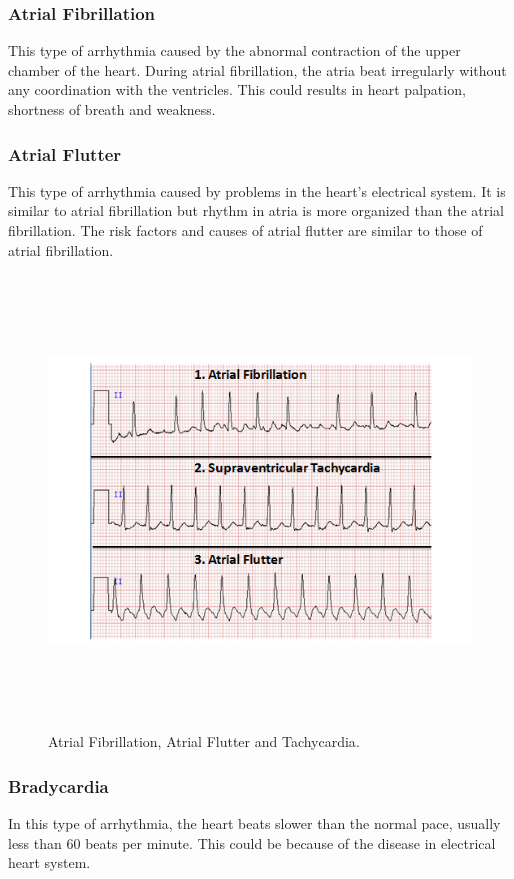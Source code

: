 \subsubsection{Atrial Fibrillation}
This type of arrhythmia caused by the abnormal contraction of the upper chamber of the heart. During atrial fibrillation, the atria beat irregularly without any coordination with the ventricles. This could results in heart palpation, shortness of breath and weakness.


\subsubsection{Atrial Flutter}
This type of arrhythmia caused by problems in the heart's electrical system. It is similar to atrial fibrillation but rhythm in atria is more organized than the atrial fibrillation. The risk factors and causes of atrial flutter are similar to those of atrial fibrillation.

\begin{figure}[htpb]
	\centering
	\includegraphics[width=15cm,height=12cm,keepaspectratio=true]{images/af}
	\caption{
		Atrial Fibrillation, Atrial Flutter and Tachycardia\cite{sumdu}.
	}
	\label{fig:af}
\end{figure}


\subsubsection{Bradycardia}
In this type of arrhythmia, the heart beats slower than the normal pace, usually less than 60 beats per minute. This could be because of the disease in electrical heart system.

